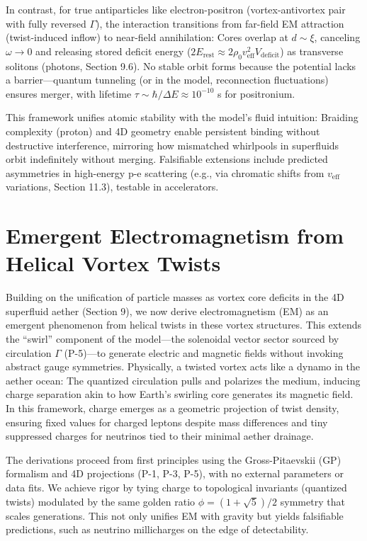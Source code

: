 \documentclass{article}
\begin{document}
In contrast, for true antiparticles like electron-positron (vortex-antivortex pair with fully reversed $\Gamma$), the interaction transitions from far-field EM attraction (twist-induced inflow) to near-field annihilation: Cores overlap at $d \sim \xi$, canceling $\omega \to 0$ and releasing stored deficit energy ($2 E_{\text{rest}} \approx 2 \rho_0 v_{\text{eff}}^2 V_{\text{deficit}}$) as transverse solitons (photons, Section 9.6). No stable orbit forms because the potential lacks a barrier—quantum tunneling (or in the model, reconnection fluctuations) ensures merger, with lifetime $\tau \sim \hbar / \Delta E \approx 10^{-10}$ s for positronium.

This framework unifies atomic stability with the model's fluid intuition: Braiding complexity (proton) and 4D geometry enable persistent binding without destructive interference, mirroring how mismatched whirlpools in superfluids orbit indefinitely without merging. Falsifiable extensions include predicted asymmetries in high-energy p-e scattering (e.g., via chromatic shifts from $v_{\text{eff}}$ variations, Section 11.3), testable in accelerators.

\section{Emergent Electromagnetism from Helical Vortex Twists}

Building on the unification of particle masses as vortex core deficits in the 4D superfluid aether (Section 9), we now derive electromagnetism (EM) as an emergent phenomenon from helical twists in these vortex structures. This extends the ``swirl'' component of the model---the solenoidal vector sector sourced by circulation $\Gamma$ (P-5)---to generate electric and magnetic fields without invoking abstract gauge symmetries. Physically, a twisted vortex acts like a dynamo in the aether ocean: The quantized circulation pulls and polarizes the medium, inducing charge separation akin to how Earth's swirling core generates its magnetic field. In this framework, charge emerges as a geometric projection of twist density, ensuring fixed values for charged leptons despite mass differences and tiny suppressed charges for neutrinos tied to their minimal aether drainage.

The derivations proceed from first principles using the Gross-Pitaevskii (GP) formalism and 4D projections (P-1, P-3, P-5), with no external parameters or data fits. We achieve rigor by tying charge to topological invariants (quantized twists) modulated by the same golden ratio $\phi = (1 + \sqrt{5})/2$ symmetry that scales generations. This not only unifies EM with gravity but yields falsifiable predictions, such as neutrino millicharges on the edge of detectability.
\end{document}
